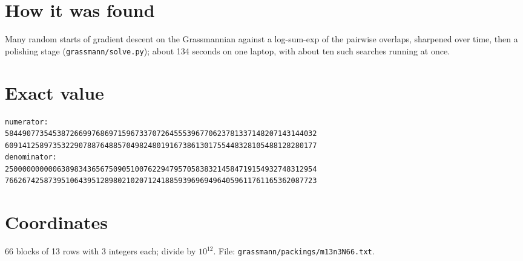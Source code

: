 \documentclass[11pt,a4paper]{article}
\begin{document}
\section{How it was found}
Many random starts of gradient descent on the Grassmannian against a log-sum-exp of the pairwise overlaps, sharpened over time, then a polishing stage (\texttt{grassmann/solve.py}); about 134 seconds on one laptop, with about ten such searches running at once.


\appendix
\section{Exact value}
{\small
\begin{verbatim}
numerator:
584490773545387266997686971596733707264555396770623781337148207143144032
609141258973532290788764885704982480191673861301755448328105488128280177
denominator:
250000000000638983436567509051007622947957058383214584719154932748312954
766267425873951064395128980210207124188593969694964059611761165362087723
\end{verbatim}}

\section{Coordinates}
66 blocks of 13 rows with 3 integers each; divide by $10^{12}$. File: \texttt{grassmann/packings/m13n3N66.txt}.
{\tiny
\begin{multicols}{3}
\end{multicols}}
\end{document}
